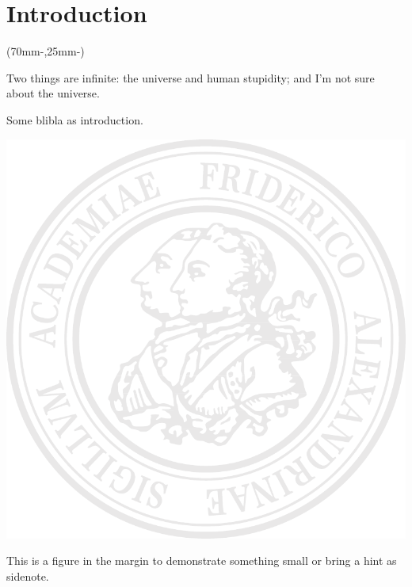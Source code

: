 
\chapter{Introduction}
\label{chap:intro}

\begin{textblock*}{.7\textwidth}(70mm-\offset,25mm-\offset)%
    \begin{fquote}
        Two things are infinite: the universe and human stupidity; and I'm not sure about the universe.
    \end{fquote}
\end{textblock*}

Some blibla as introduction. \autocite{machowskiPowerSystemDynamics2020}

\begin{sidefigure}
    \begin{center}
        \includegraphics[width=.9\linewidth]{images/fausiegel.pdf}
    \end{center}
    \vspace*{-6pt}
    This is a figure in the margin to demonstrate something small or bring a hint as sidenote.
\end{sidefigure}

\lipsum[1]

